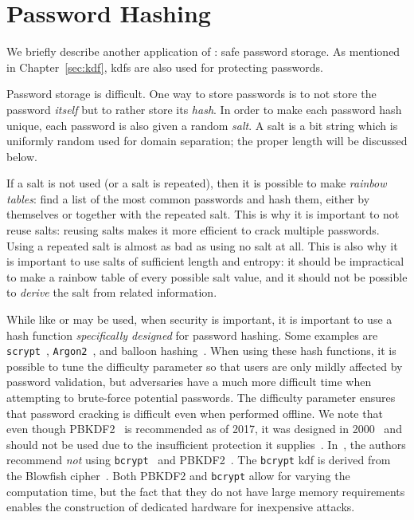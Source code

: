 \section{Password Hashing}
\label{sec:hash_apps_password_hashing}

We briefly describe another application of :
safe password storage.
As mentioned in Chapter~\ref{sec:kdf}, \glspl{kdf}
are also used for protecting passwords.

Password storage is difficult.
One way to store passwords is to not store the password \emph{itself}
but to rather store its \emph{hash}.
In order to make each password hash unique, each password
is also given a random \emph{\gls{salt}}.
A \gls{salt} is a bit string which is uniformly random used
for domain separation;
the proper length will be discussed below.

If a \gls{salt} is not used (or a \gls{salt} is repeated),
then it is possible to make \emph{rainbow tables}:
find a list of the most common passwords and hash them,
either by themselves or together with the repeated \gls{salt}.
This is why it is important to not reuse \glspl{salt}:
reusing \glspl{salt} makes it more efficient to crack multiple passwords.
Using a repeated \gls{salt} is almost as bad as
using no \gls{salt} at all.
This is also why it is important to use \glspl{salt}
of sufficient length and entropy:
it should be impractical to make a rainbow table
of every possible \gls{salt} value,
and it should not be possible to \emph{derive} the \gls{salt}
from related information.

While  like \ShaTwo{} or \ShaThree{} may be used,
when security is important, it is important to use a \gls{hash function}
\emph{specifically designed} for password hashing.
Some examples are \texttt{scrypt}~\cite{scryptPaper,rfc7914},
\texttt{Argon2}~\cite{argon2},
and balloon hashing~\cite{cryptoeprint:2016:027}.
When using these \glspl{hash function}, it is possible to tune
the difficulty parameter so that users are only mildly affected
by password validation,
but adversaries have a much more difficult time
when attempting to brute-force potential passwords.
The difficulty parameter ensures that password cracking is difficult
even when performed offline.
We note that even though PBKDF2~\cite{rfc8018} is recommended
as of 2017, it was designed in 2000~\cite{rfc2898}
and should not be used due to the insufficient protection
it supplies~\cite{blocki2018economics}.
In~\cite{blocki2018economics}, the authors recommend \emph{not}
using \texttt{bcrypt}~\cite{bcryptPaper}
and PBKDF2~\cite{rfc2898}.
The \texttt{bcrypt} \gls{kdf}
is derived from the Blowfish cipher~\cite{BlowfishAlg}.
Both PBKDF2 and \texttt{bcrypt} allow for varying the computation time,
but the fact that they do not have large memory requirements
enables the construction of dedicated hardware
for inexpensive attacks.

